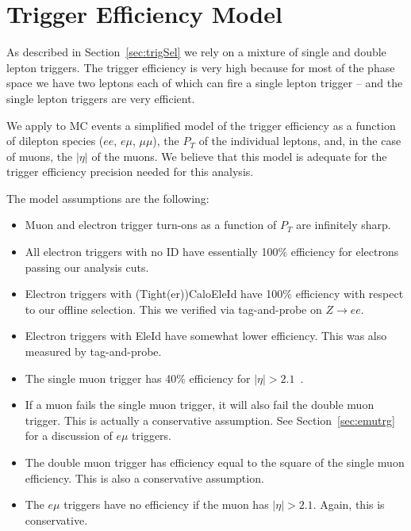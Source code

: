 \setcounter{table}{0}
\renewcommand\thetable{\Alph{section}.\arabic{table}}
\setcounter{figure}{0}
\renewcommand\thefigure{\Alph{section}.\arabic{figure}}
\section{Trigger Efficiency Model}
\label{sec:trgEff}

As described in Section~\ref{sec:trigSel} we rely on a
mixture of single and double lepton triggers.  The trigger
efficiency is very high because for most of the phase space 
we have two leptons each of which can fire a single lepton 
trigger -- and the single lepton triggers are very efficient.

We apply to MC events a simplified model of the trigger efficiency 
as a function of dilepton species ($ee$, $e\mu$, $\mu\mu$), the $P_T$ 
of the individual leptons, and, in the case of muons, the $|\eta|$
of the muons.  We believe that this model is adequate for
the trigger efficiency precision needed for this analysis.

The model assumptions are the following:

\begin{itemize}

\item Muon and electron trigger turn-ons as a function of $P_T$
are infinitely sharp. %

\item All electron triggers with no ID have essentially 100\%
efficiency for electrons passing our analysis cuts\cite{ref:evans}.

\item Electron triggers with (Tight(er))CaloEleId have 100\%
efficiency with respect to our offline selection.  This we 
verified via tag-and-probe on $Z\to ee$.

\item Electron triggers with EleId have somewhat lower
efficiency.  This was also measured by tag-and-probe.

\item The single muon trigger has 40\% efficiency for 
$|\eta|>2.1$~\cite{ref:evans}.

\item If a muon fails the single muon trigger, it
will also fail the double muon trigger.  This is actually 
a conservative assumption.  See Section~\ref{sec:emutrg}
for a discussion of $e\mu$ triggers.

\item The double muon trigger has efficiency
equal to the square of the single muon efficiency.  This is
also a conservative assumption.

\item The $e\mu$ triggers have no efficiency if the muon has $|\eta|>2.1$.
Again, this is conservative.
\end{itemize}

